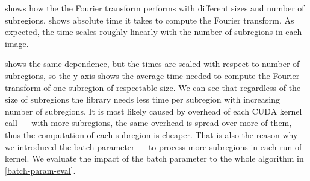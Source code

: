  shows how the the Fourier transform performs with different sizes and number of subregions.  shows absolute time it takes to compute the Fourier transform. As expected, the time scales roughly linearly with the number of subregions in each image.

 shows the same dependence, but the times are scaled with respect to number of subregions, so the y axis shows the average time needed to compute the Fourier transform of one subregion of respectable size. We can see that regardless of the size of subregions the library needs less time per subregion with increasing number of subregions. It is most likely caused by overhead of each CUDA kernel call --- with more subregions, the same overhead is spread over more of them, thus the computation of each subregion is cheaper. That is also the reason why we introduced the batch parameter --- to process more subregions in each run of kernel. We evaluate the impact of the batch parameter to the whole algorithm in \cref{batch-param-eval}.


